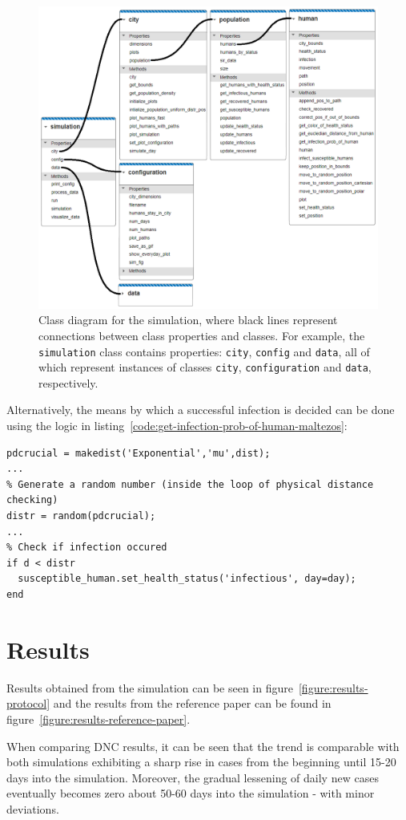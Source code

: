 \documentclass[a4paper]{article}
\newcommand{\code}{\texttt}
\begin{document}
\begin{figure}[h!]
	\centering
	\includegraphics[scale=0.65]{images/simulation_class_diagram.png}
	\caption{Class diagram for the simulation, where black lines represent connections between class properties and classes. For example, the \code{simulation} class contains properties: \code{city}, \code{config} and \code{data}, all of which represent instances of classes \code{city}, \code{configuration} and \code{data}, respectively.}
	\label{figure:simulation-class-diagram}
\end{figure}
\noindent
Alternatively, the means by which a successful infection is decided can be done using the logic in listing~\ref{code:get-infection-prob-of-human-maltezos}:
\begin{lstlisting}[caption={Alternative means of infection that better reflects the use of the exponential distribution.}, label={code:get-infection-prob-of-human-maltezos}]
% Create the exponential distribution (initially)
pdcrucial = makedist('Exponential','mu',dist);
...
% Generate a random number (inside the loop of physical distance checking)
distr = random(pdcrucial);
...
% Check if infection occured
if d < distr 
  susceptible_human.set_health_status('infectious', day=day);
end
\end{lstlisting}




\section{Results}\label{section:results}
Results obtained from the simulation can be seen in figure~\ref{figure:results-protocol} and the results from the reference paper \cite{Maltezos2021} can be found in figure~\ref{figure:results-reference-paper}.
\par
When comparing DNC results, it can be seen that the trend is comparable with both simulations exhibiting a sharp rise in cases from the beginning until 15-20 days into the simulation. Moreover, the gradual lessening of daily new cases eventually becomes zero about 50-60 days into the simulation - with minor deviations.
\end{document}
